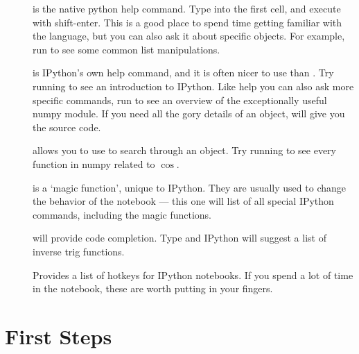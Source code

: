 \documentclass[justified, nobib]{tufte-handout}
\begin{document}
\begin{description}
\item[] is the native python help command.
  Type  into the first cell, and execute with
  shift-enter.
  This is a good place to spend time getting familiar with the language, but
  you can also ask it about specific objects.
  For example, run  to see some common list
  manipulations.

\item[] is IPython's own help command, and it is often nicer
  to use than .
  Try running  to see an introduction to IPython.
  Like help you can also ask more specific commands, run
   to see an overview of the exceptionally
  useful numpy module.
  If you need all the gory details of an object,  will
  give you the source code.

\item[] allows you to use
   to search through an object.
  Try running  to see every
  function in numpy related to $\cos$.



\item[]
  is a `magic function', unique to IPython.
  They are usually used to change the behavior of the notebook
  --- this one will list of all special IPython commands, including the magic
  functions.

\item[] will provide code completion.
  Type  and IPython
  will suggest a list of inverse trig functions.

\item[] Provides a list of hotkeys for IPython
  notebooks.
  If you spend a lot of time in the notebook, these are worth putting in your
  fingers.

\end{description}


\pagebreak
\section*{First Steps}


\pagebreak
\end{document}
